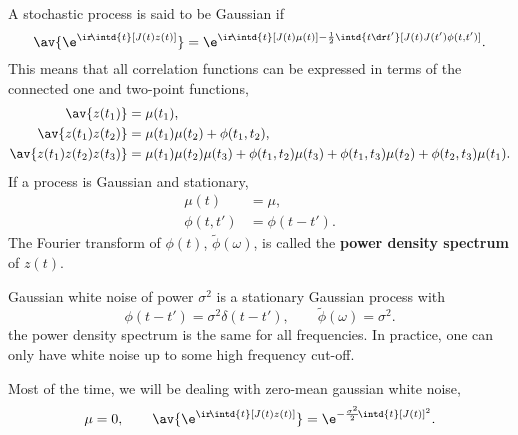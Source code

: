 \documentclass[12pt]{article}
\begin{document}
\begin{defn}
  A stochastic process is said to be Gaussian if
  \begin{equation}\label{eq:gaussproc}
    \av{\e^{\ir\!\intd{t} [J(t) z(t)]}}
      = \e^{\ir\!\intd{t} [J(t)\mu(t)] - \frac{1}{2}\intd{t\dr t'} [J(t)J(t')\phi(t,t')]}.
  \end{equation}
  This means that all correlation functions can be expressed in terms of the connected one and two-point functions, \eg
  \begin{equation}\label{eq:gaussmom}
    \begin{aligned}
      \av{z(t_1)} &= \mu(t_1), \\
      \av{z(t_1)z(t_2)} &= \mu(t_1)\mu(t_2) + \phi(t_1,t_2), \\
      \av{z(t_1)z(t_2)z(t_3)}
        &= \mu(t_1)\mu(t_2)\mu(t_3) + \phi(t_1,t_2)\mu(t_3)
            + \phi(t_1,t_3)\mu(t_2) + \phi(t_2,t_3)\mu(t_1).
    \end{aligned}
  \end{equation}
  If a process is Gaussian and stationary,
  \begin{equation}\label{eq:statgauss}
    \begin{aligned}
      \mu(t) &= \mu, \\
      \phi(t,t')  &= \phi(t-t').
    \end{aligned}
  \end{equation}
  The Fourier transform of $\phi(t)$, $\tilde{\phi}(\omega)$, is called the \textbf{power density spectrum} of $z(t)$.
\end{defn}

\begin{defn}
  Gaussian white noise of power $\sigma^2$ is a stationary Gaussian process with
  \begin{equation}\label{eq:gaussianwhite}
    \phi(t-t') = \sigma^2\delta(t-t'), \qquad
    \tilde{\phi}(\omega) = \sigma^2.
  \end{equation}
  \ie the power density spectrum is the same for all frequencies.
  In practice, one can only have white noise up to some high frequency cut-off.
\end{defn}

Most of the time, we will be dealing with zero-mean gaussian white noise, \ie
%
\begin{equation}\label{eq:zeromeanwhite}
  \mu=0, \qquad
  \av{\e^{\ir\!\intd{t} [J(t) z(t)]}} = \e^{-\frac{\sigma^2}{2}\!\intd{t} [J(t)]^2}.
\end{equation}
%
\end{document}
